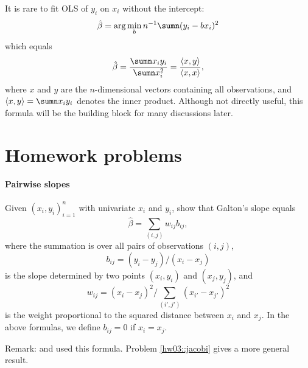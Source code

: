 It is rare to fit OLS of $y_i$ on $x_i$ without the intercept: 
\[
 \hat{\beta}=\arg\min_{b}n^{-1}\sumn(y_{i} -b x_{i})^{2} 
\]
which equals 
$$
 \hat{\beta} 
 = \frac{ \sumn x_iy_i }{  \sumn x_i^2 } = \frac{  \langle x, y \rangle   }{ \langle x, x \rangle } , 
 $$
 where $x$ and $y$ are the $n$-dimensional vectors containing all observations, and $\langle x, y \rangle = \sumn x_iy_i$ denotes the inner product. 
Although not directly useful, this formula will be the building block for many discussions later. 


\section{Homework problems}

  

\paragraph{Pairwise slopes}\label{hw2::pairwise-slope}
Given $(x_i, y_i)_{i=1}^n$ with univariate $x_i$ and $y_i$, show that Galton's slope equals
$$
\hat{\beta} = \sum_{(i,j)} w_{ij} b_{ij},
$$
where the summation is over all pairs of observations $(i,j)$, 
$$
b_{ij} = (y_i - y_j ) / (x_i - x_j ) 
$$
is the slope determined by two points $(x_i,y_i)$ and $(x_j, y_j)$, and 
$$
w_{ij} = (x_i - x_j)^2 / \sum_{(i',j')} (x_{i'} - x_{j'})^2
$$
is the weight proportional to the squared distance between $x_i$ and $x_j$. In the above formulas, we define $b_{ij} = 0$ if $x_i=x_j$.

Remark: \citet{wu1986jackknife} and
\citet{gelman2009splitting} used this formula. 
Problem \ref{hw03::jacobi} gives a more general result. 


 
